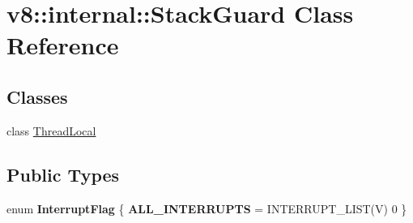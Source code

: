 \hypertarget{classv8_1_1internal_1_1_stack_guard}{}\section{v8\+:\+:internal\+:\+:Stack\+Guard Class Reference}
\label{classv8_1_1internal_1_1_stack_guard}
\subsection*{Classes}
\begin{DoxyCompactItemize}
\item 
class \hyperlink{classv8_1_1internal_1_1_stack_guard_1_1_thread_local}{Thread\+Local}
\end{DoxyCompactItemize}
\subsection*{Public Types}
\begin{DoxyCompactItemize}
\item 
enum {\bfseries Interrupt\+Flag} \{ {\bfseries A\+L\+L\+\_\+\+I\+N\+T\+E\+R\+R\+U\+P\+TS} = I\+N\+T\+E\+R\+R\+U\+P\+T\+\_\+\+L\+I\+ST(V) 0
 \}\hypertarget{classv8_1_1internal_1_1_stack_guard_ac114a7605ed03e1dccfa3b58ab575a37}{}\label{classv8_1_1internal_1_1_stack_guard_ac114a7605ed03e1dccfa3b58ab575a37}

\end{DoxyCompactItemize}
